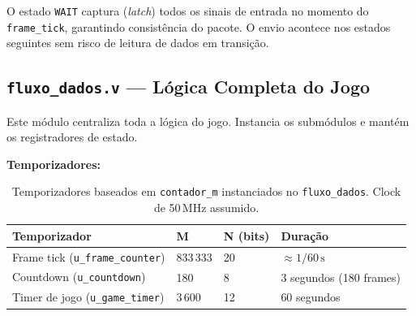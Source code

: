 \documentclass[12pt,a4paper]{article}
\begin{document}
\begin{center}
\end{center}

O estado \texttt{WAIT} captura (\emph{latch}) todos os sinais de entrada no momento do \texttt{frame\_tick}, garantindo consistência do pacote. O envio acontece nos estados seguintes sem risco de leitura de dados em transição.

\subsection{\texttt{fluxo\_dados.v} — Lógica Completa do Jogo}

Este módulo centraliza toda a lógica do jogo. Instancia os submódulos e mantém os registradores de estado.

\textbf{Temporizadores:}

\begin{table}[H]
\centering
\begin{tabular}{llll}
\toprule
\textbf{Temporizador} & \textbf{M} & \textbf{N (bits)} & \textbf{Duração} \\
\midrule
Frame tick (\texttt{u\_frame\_counter}) & 833\,333 & 20 & $\approx 1/60\,\text{s}$ \\
Countdown (\texttt{u\_countdown})       & 180      & 8  & 3 segundos (180 frames) \\
Timer de jogo (\texttt{u\_game\_timer}) & 3\,600   & 12 & 60 segundos \\
\bottomrule
\end{tabular}
\caption{Temporizadores baseados em \texttt{contador\_m} instanciados no \texttt{fluxo\_dados}. Clock de 50\,MHz assumido.}
\end{table}
\end{document}
